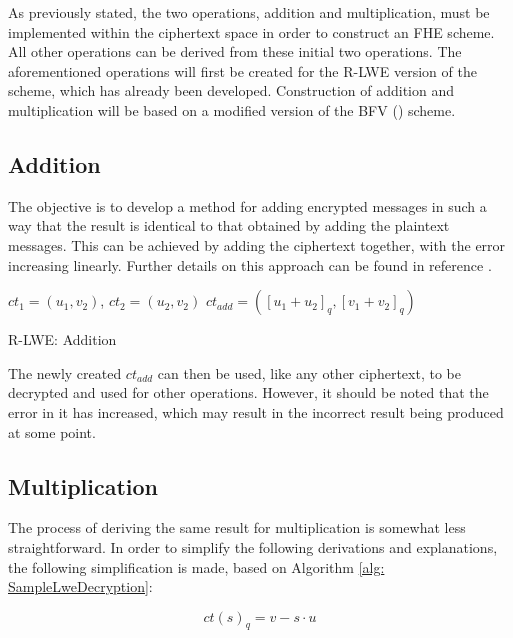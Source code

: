 As previously stated, the two operations, addition and multiplication, must be implemented within the ciphertext space in order to construct an FHE scheme. All other operations can be derived from these initial two operations. The aforementioned operations will first be created for the R-LWE version of the scheme, which has already been developed. Construction of addition and multiplication will be based on a modified version of the BFV (\cite{bfv}) scheme.

\subsection*{Addition}

The objective is to develop a method for adding encrypted messages in such a way that the result is identical to that obtained by adding the plaintext messages. This can be achieved by adding the ciphertext together, with the error increasing linearly. Further details on this approach can be found in reference \cite{bfv}. 

\begin{algorithm}[htb]
  \begin{algorithmic}[1]
    \REQUIRE $ct_1 = (u_1, v_2)$, $ct_2 = (u_2, v_2)$
    \RETURN $ct_{add} = ([u_1 + u_2]_q, [v_1 + v_2]_q)$
  \end{algorithmic}
  \caption{R-LWE: Addition}
  \label{alg:RlweAddition}
\end{algorithm}

The newly created $ct_{add}$ can then be used, like any other ciphertext, to be decrypted and used for other operations. However, it should be noted that the error in it has increased, which may result in the incorrect result being produced at some point.

\subsection*{Multiplication}

The process of deriving the same result for multiplication is somewhat less straightforward. In order to simplify the following derivations and explanations, the following simplification is made, based on Algorithm \ref{alg: SampleLweDecryption}:

\begin{equation}
  ct(s)_q = v-s\cdot u
  \label{eq:baseCt}
\end{equation}

